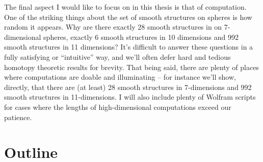 The final aspect I would like to focus on in this thesis is that of computation.
One of the striking things about the set of smooth structures on spheres is how random it appears. Why are there exactly 28 smooth structures in on 7-dimensional spheres, exactly 6 smooth structures in 10 dimensions and 992 smooth structures in 11 dimensions? It's difficult to answer these questions in a fully satisfying or ``intuitive'' way, and we'll often defer hard and tedious homotopy theoretic results for brevity.
That being said, there are plenty of places where computations are doable and illuminating -- for instance we'll show, directly, that there are (at least) 28 smooth structures in 7-dimensions and 992 smooth structures in 11-dimensions. I will also include plenty of Wolfram scripts for cases where the lengths of high-dimensional computations exceed our patience.

\section*{Outline}
